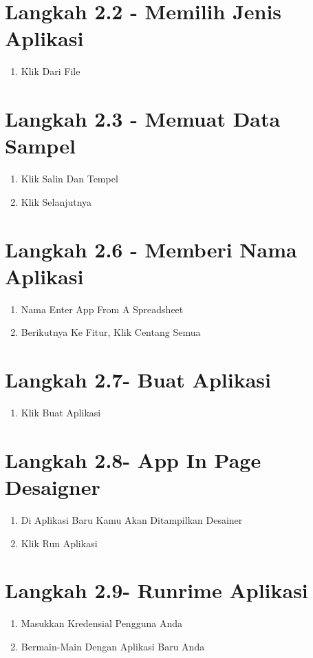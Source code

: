 \documentclass{article}
\begin{document}
\section{Langkah 2.2 - Memilih Jenis Aplikasi}
\begin{enumerate}
    \item Klik Dari File
\end{enumerate}
\section{Langkah 2.3 - Memuat Data Sampel}
    \begin{enumerate}
        \item Klik Salin Dan Tempel
        \item Klik Selanjutnya
    \end{enumerate}
\section{Langkah 2.6 - Memberi Nama Aplikasi}
    \begin{enumerate}
        \item Nama Enter {App From A Spreadsheet}
        \item Berikutnya Ke Fitur, Klik Centang Semua

    \end{enumerate}
\section{Langkah 2.7- Buat Aplikasi}
\begin{enumerate}
    \item Klik Buat Aplikasi
\end{enumerate}
\section{Langkah 2.8- App In Page Desaigner}
\begin{enumerate}
    \item Di Aplikasi Baru Kamu Akan Ditampilkan Desainer
    \item Klik Run Aplikasi

\end{enumerate}
\section{Langkah 2.9- Runrime Aplikasi}
\begin{enumerate}
    \item Masukkan Kredensial Pengguna Anda
    \item Bermain-Main Dengan Aplikasi Baru Anda

\end{enumerate}
\end{document}
